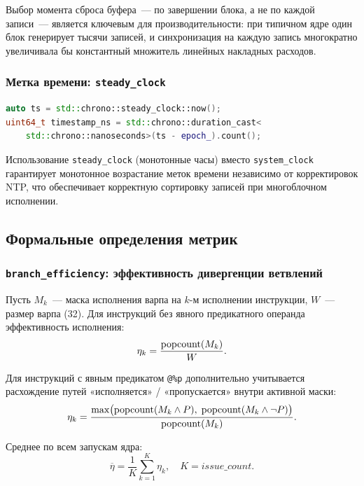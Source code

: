 Выбор момента сброса буфера~--- по завершении блока, а не по каждой записи~---
является ключевым для производительности: при типичном ядре один блок
генерирует тысячи записей, и синхронизация на каждую запись многократно увеличивала бы константный множитель линейных накладных расходов.

\subsubsection{Метка времени: \texttt{steady\_clock}}

\begin{lstlisting}[language=C++, caption={Получение временной метки}]
auto ts = std::chrono::steady_clock::now();
uint64_t timestamp_ns = std::chrono::duration_cast<
    std::chrono::nanoseconds>(ts - epoch_).count();
\end{lstlisting}

Использование \texttt{steady\_clock} (монотонные часы) вместо
\texttt{system\_clock} гарантирует монотонное возрастание меток времени
независимо от корректировок NTP, что обеспечивает корректную сортировку
записей при многоблочном исполнении.

\subsection{Формальные определения метрик}

\subsubsection{\texttt{branch\_efficiency}: эффективность дивергенции ветвлений}

Пусть $M_k$~--- маска исполнения варпа на $k$-м исполнении инструкции,
$W$~--- размер варпа (32). Для инструкций без явного предикатного
операнда эффективность исполнения:
\begin{equation}
  \label{eq:branch_eff}
  \eta_k = \frac{\mathrm{popcount}(M_k)}{W}.
\end{equation}

Для инструкций с явным предикатом \texttt{@\%p} дополнительно
учитывается расхождение путей «исполняется» / «пропускается»
внутри активной маски:
\begin{equation}
  \eta_k = \frac{\max\bigl(\mathrm{popcount}(M_k \wedge P),\;
                           \mathrm{popcount}(M_k \wedge \neg P)\bigr)}
                {\mathrm{popcount}(M_k)}.
\end{equation}

Среднее по всем запускам ядра:
\begin{equation}
  \overline{\eta} = \frac{1}{K}\sum_{k=1}^{K} \eta_k,
  \quad K = \mathit{issue\_count}.
\end{equation}

